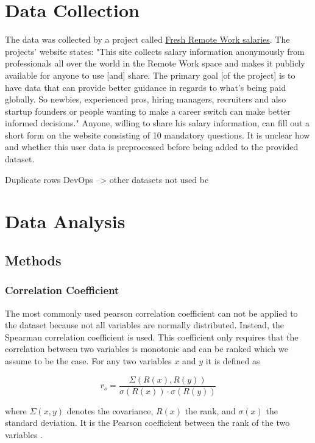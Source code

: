 \documentclass{article}
\begin{document}
\section{Data Collection}
The data was collected by a project called \href{https://salaries.freshremote.work/download/}{Fresh Remote Work salaries}. The projects' website states: "This site collects salary information anonymously from professionals all over the world in the Remote Work space and makes it publicly available for anyone to use [and] share. The primary goal [of the project] is to have data that can provide better guidance in regards to what's being paid globally. So newbies, experienced pros, hiring managers, recruiters and also startup founders or people wanting to make a career switch can make better informed decisions." Anyone, willing to share his salary information, can fill out a short form on the website consisting of 10 mandatory questions. It is unclear how and whether this user data is preprocessed before being added to the provided dataset. 

Duplicate rows DevOps
--> other datasets not used bc 


\section{Data Analysis}
\subsection{Methods}
\subsubsection{Correlation Coefficient}
The most commonly used pearson correlation coefficient can not be applied to the dataset because not all variables are normally distributed. Instead, the Spearman correlation coefficient is used. This coefficient only requires that the correlation between two variables is monotonic and can be ranked which we assume to be the case. For any two variables $x$ and $y$ it is defined as

\begin{equation}
    r_s = \frac{\Sigma(R(x), R(y))}{\sigma(R(x)) \cdot \sigma(R(y))}
\end{equation}

where $\Sigma(x, y)$ denotes the covariance, $R(x)$ the rank, and $\sigma(x)$ the standard deviation. It is the Pearson coefficient between the rank of the two variables \cite{spearman1904proof}.
\end{document}
